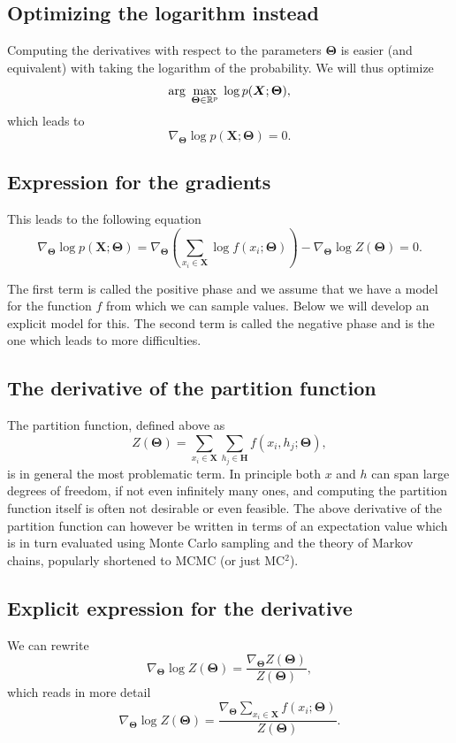 \documentclass[%
oneside,                 %
final,                   %
10pt]{article}
\begin{document}
\subsection{Optimizing the logarithm instead}

Computing the derivatives with respect to the parameters $\bm{\Theta}$ is
easier (and equivalent) with taking the logarithm of the
probability. We will thus optimize
\[
{\displaystyle \mathrm{arg} \hspace{0.1cm}\max_{\bm{\bm{\Theta}}\in {\mathbb{R}}^{p}}} \hspace{0.1cm}\log{p(\bm{X};\bm{\Theta})},
\]
which leads to
\[
\nabla_{\bm{\Theta}}\log{p(\bm{X};\bm{\Theta})}=0.
\]

\subsection{Expression for the gradients}
This leads to the following equation
\[
\nabla_{\bm{\Theta}}\log{p(\bm{X};\bm{\Theta})}=\nabla_{\bm{\Theta}}\left(\sum_{x_i\in \bm{X}}\log{f(x_i;\bm{\Theta})}\right)-\nabla_{\bm{\Theta}}\log{Z(\bm{\Theta})}=0.
\]

The first term is called the positive phase and we assume that we have a model for the function $f$ from which we can sample values. Below we will develop an explicit model for this.
The second term is called the negative phase and is the one which leads to more difficulties.

\subsection{The derivative of the partition function}

The partition function, defined above as
\[
Z(\bm{\Theta})=\sum_{x_i\in \bm{X}}\sum_{h_j\in \bm{H}} f(x_i,h_j;\bm{\Theta}),
\]
is in general the most problematic term. In principle both $x$ and $h$ can span large degrees of freedom, if not even infinitely many ones, and computing the partition function itself is often not desirable or even feasible. The above derivative of the partition function can however be written in terms of an expectation value which is in turn evaluated  using Monte Carlo sampling and the theory of Markov chains, popularly shortened to MCMC (or just MC$^2$).

\subsection{Explicit expression for the derivative}
We can rewrite
\[
\nabla_{\bm{\Theta}}\log{Z(\bm{\Theta})}=\frac{\nabla_{\bm{\Theta}}Z(\bm{\Theta})}{Z(\bm{\Theta})},
\]
which reads in more detail
\[
\nabla_{\bm{\Theta}}\log{Z(\bm{\Theta})}=\frac{\nabla_{\bm{\Theta}} \sum_{x_i\in \bm{X}}f(x_i;\bm{\Theta})   }{Z(\bm{\Theta})}.
\]
\end{document}

